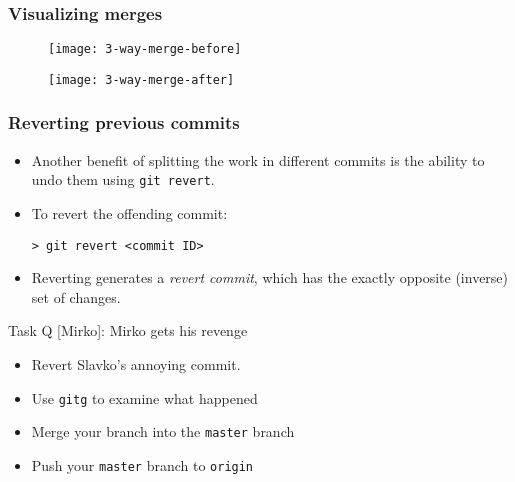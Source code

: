 
\begin{frame}[fragile]

\frametitle{Visualizing merges}

\begin{multicols}{2}
	\begin{figure}
		\texttt{[image: 3-way-merge-before]}
	\end{figure}
	\begin{figure}
		\texttt{[image: 3-way-merge-after]}
	\end{figure}
\end{multicols}

\end{frame}


\begin{frame}[fragile]

\frametitle{Reverting previous commits}

	\begin{itemize}
	\item Another benefit of splitting the work in different commits is the ability to undo them using \texttt{git revert}.
	\item To revert the offending commit:
	\begin{verbatim}
> git revert <commit ID>
	\end{verbatim}
	\item Reverting generates a \textit{revert commit}, which has the exactly opposite (inverse) set of changes.
	\end{itemize}

	\begin{block}{Task Q [Mirko]: Mirko gets his revenge}
	\begin{itemize}
	\item Revert Slavko's annoying commit.
	\item Use \texttt{gitg} to examine what happened
	\item Merge your branch into the \texttt{master} branch
    \item Push your \texttt{master} branch to \texttt{origin}
	\end{itemize}
	\end{block}
\end{frame}


